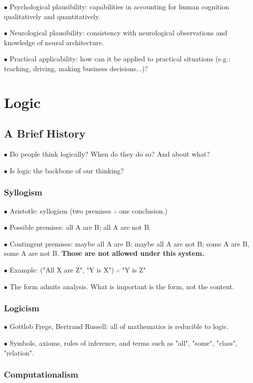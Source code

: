 \documentclass[english,openany]{book}
\begin{document}
$\bullet$ Psychological plausibility: capabilities in accounting for human cognition qualitatively and quantitatively.

$\bullet$ Neurological plausibility: consistency with neurological observations and knowledge of neural architecture. 

$\bullet$ Practical applicability: how can it be applied to practical situations (e.g.: teaching, driving, making business decisions...)?

\chapter{Logic}

\section{A Brief History}

$\bullet$ Do people think logically? When do they do so? And about what?

$\bullet$ Is logic the backbone of our thinking?

\subsection{Syllogism}

$\bullet$ Aristotle: syllogism (two premises $\therefore$ one conclusion.)

$\bullet$ Possible premises: all A are B; all A are not B.

$\bullet$ Contingent premises: maybe all A are B; maybe all A are not B; some A are B, some A are not B. \textbf{Those are not allowed under this system.}

$\bullet$ Example: ("All X are Z", "Y is X") $\therefore$ "Y is Z"

$\bullet$ The form admits analysis. What is important is the form, not the content.

\subsection{Logicism}

$\bullet$ Gottlob Frege, Bertrand Russell: all of mathematics is reducible to logic.

$\bullet$ Symbols, axioms, rules of inference, and terms such as "all", "some", "class", "relation".

\subsection{Computationalism}
\end{document}
